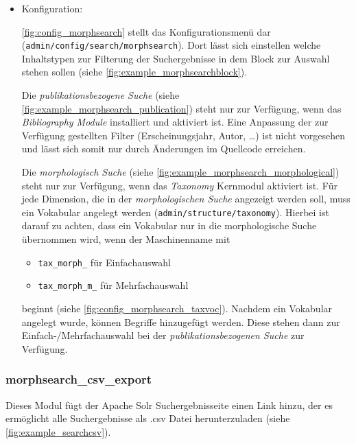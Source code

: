 \begin{itemize}[parsep=0pt, itemsep=5.0pt plus 2.0pt minus 1.0pt, leftmargin=*]
	\item Konfiguration:
	
	\cref{fig:config_morphsearch} stellt das Konfigurationsmenü dar (\lstinline|admin/config/search/morphsearch|). Dort lässt sich einstellen welche Inhaltstypen zur Filterung der Suchergebnisse in dem Block zur Auswahl stehen sollen (siehe \cref{fig:example_morphsearchblock}).
	
	Die \textit{publikationsbezogene Suche} (siehe \cref{fig:example_morphsearch_publication}) steht nur zur Verfügung, wenn das \textit{Bibliography Module} installiert und aktiviert ist. Eine Anpassung der zur Verfügung gestellten Filter (Erscheinungsjahr, Autor, \dots) ist nicht vorgesehen und lässt sich somit nur durch Änderungen im Quellcode erreichen.
	
	Die \textit{morphologisch Suche} (siehe \cref{fig:example_morphsearch_morphological}) steht nur zur Verfügung, wenn das \textit{Taxonomy} Kernmodul aktiviert ist. Für jede Dimension, die in der \textit{morphologischen Suche} angezeigt werden soll, muss ein Vokabular angelegt werden (\lstinline|admin/structure/taxonomy|). Hierbei ist darauf zu achten, dass ein Vokabular nur in die morphologische Suche übernommen wird, wenn der Maschinenname mit
	\begin{itemize}
		\item \lstinline|tax_morph_| für Einfachauswahl
		\item \lstinline|tax_morph_m_| für Mehrfachauswahl
	\end{itemize}
	beginnt (siehe \cref{fig:config_morphsearch_taxvoc}). Nachdem ein Vokabular angelegt wurde, können Begriffe hinzugefügt werden. Diese stehen dann zur Einfach-/Mehrfachauswahl bei der \textit{publikationsbezogenen Suche} zur Verfügung.
	
\end{itemize}


\subsubsection{morphsearch\_csv\_export}\label{subsub:morphsearchcsv}

Dieses Modul fügt der Apache Solr Suchergebnisseite einen Link hinzu, der es ermöglicht alle Suchergebnisse als .csv Datei herunterzuladen (siehe \cref{fig:example_searchcsv}).

